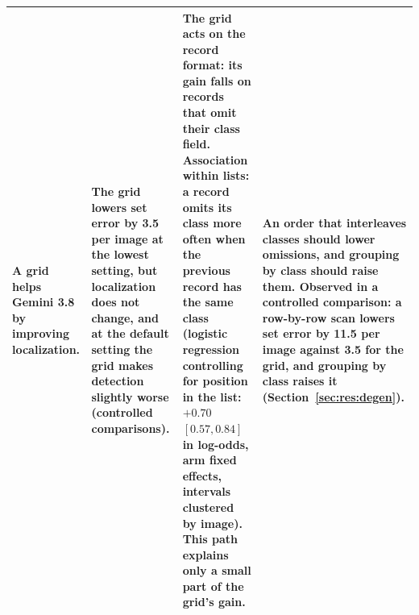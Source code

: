 \begin{table}[tp]
\begin{tabular}{@{}>{\raggedright\arraybackslash}p{3.1cm}>{\raggedright\arraybackslash}p{3.4cm}>{\raggedright\arraybackslash}p{4.0cm}>{\raggedright\arraybackslash}p{4.5cm}@{}}
A grid helps Gemini 3.8 by improving localization. & The grid lowers set error by 3.5 per image at the lowest setting, but localization does not change, and at the default setting the grid makes detection slightly worse (controlled comparisons). & The grid acts on the record format: its gain falls on records that omit their class field. Association within lists: a record omits its class more often when the previous record has the same class (logistic regression controlling for position in the list: $+0.70$ $[0.57,0.84]$ in log-odds, arm fixed effects, intervals clustered by image). This path explains only a small part of the grid's gain. & An order that interleaves classes should lower omissions, and grouping by class should raise them. Observed in a controlled comparison: a row-by-row scan lowers set error by 11.5 per image against 3.5 for the grid, and grouping by class raises it (Section~\ref{sec:res:degen}). \\\bottomrule
\end{tabular}
\end{table}
